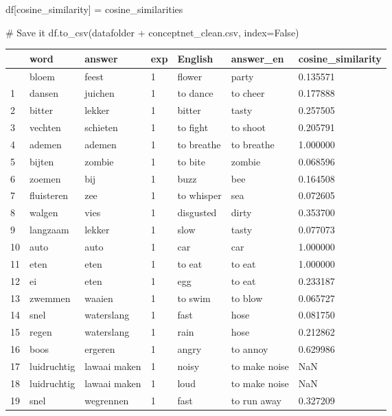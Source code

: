 \documentclass[
  letterpaper,
  DIV=11,
  numbers=noendperiod]{scrreprt}
\newenvironment{Shaded}{\begin{snugshade}}{\end{snugshade}}
\newcommand{\CommentTok}[1]{\textcolor[rgb]{0.37,0.37,0.37}{#1}}
\newcommand{\NormalTok}[1]{\textcolor[rgb]{0.00,0.23,0.31}{#1}}
\newcommand{\OperatorTok}[1]{\textcolor[rgb]{0.37,0.37,0.37}{#1}}
\newcommand{\StringTok}[1]{\textcolor[rgb]{0.13,0.47,0.30}{#1}}
\newcommand{\VariableTok}[1]{\textcolor[rgb]{0.07,0.07,0.07}{#1}}
\begin{document}
\begin{Shaded}
\begin{Highlighting}[]
\NormalTok{df[}\StringTok{\textquotesingle{}cosine\_similarity\textquotesingle{}}\NormalTok{] }\OperatorTok{=}\NormalTok{ cosine\_similarities}

\CommentTok{\# Save it}
\NormalTok{df.to\_csv(datafolder }\OperatorTok{+} \StringTok{\textquotesingle{}conceptnet\_clean.csv\textquotesingle{}}\NormalTok{, index}\OperatorTok{=}\VariableTok{False}\NormalTok{)}
\end{Highlighting}
\end{Shaded}

\begin{longtable}[]{@{}lllllll@{}}
\toprule\noalign{}
& word & answer & exp & English & answer\_en & cosine\_similarity \\
\midrule\noalign{}
\endhead
\bottomrule\noalign{}
\endlastfoot
0 & bloem & feest & 1 & flower & party & 0.135571 \\
1 & dansen & juichen & 1 & to dance & to cheer & 0.177888 \\
2 & bitter & lekker & 1 & bitter & tasty & 0.257505 \\
3 & vechten & schieten & 1 & to fight & to shoot & 0.205791 \\
4 & ademen & ademen & 1 & to breathe & to breathe & 1.000000 \\
5 & bijten & zombie & 1 & to bite & zombie & 0.068596 \\
6 & zoemen & bij & 1 & buzz & bee & 0.164508 \\
7 & fluisteren & zee & 1 & to whisper & sea & 0.072605 \\
8 & walgen & vies & 1 & disgusted & dirty & 0.353700 \\
9 & langzaam & lekker & 1 & slow & tasty & 0.077073 \\
10 & auto & auto & 1 & car & car & 1.000000 \\
11 & eten & eten & 1 & to eat & to eat & 1.000000 \\
12 & ei & eten & 1 & egg & to eat & 0.233187 \\
13 & zwemmen & waaien & 1 & to swim & to blow & 0.065727 \\
14 & snel & waterslang & 1 & fast & hose & 0.081750 \\
15 & regen & waterslang & 1 & rain & hose & 0.212862 \\
16 & boos & ergeren & 1 & angry & to annoy & 0.629986 \\
17 & luidruchtig & lawaai maken & 1 & noisy & to make noise & NaN \\
18 & luidruchtig & lawaai maken & 1 & loud & to make noise & NaN \\
19 & snel & wegrennen & 1 & fast & to run away & 0.327209 \\
\end{longtable}
\end{document}
